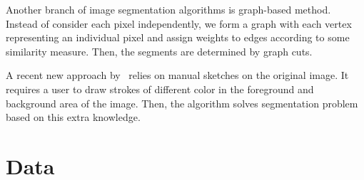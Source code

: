 \documentclass{article} %
\begin{document}
Another branch of image segmentation algorithms is graph-based
method. Instead of consider each pixel independently, we form a graph
with each vertex representing an individual pixel and assign weights
to edges according to some similarity measure. Then, the segments are
determined by graph cuts.




A recent new approach 
by~\citet{Boykov2006graph} relies on manual sketches on the original
 image. It requires a user to draw strokes of different color in the foreground 
and background area of the image. Then, the algorithm solves segmentation
problem based on this extra knowledge. 

\section{Data}
\end{document}
